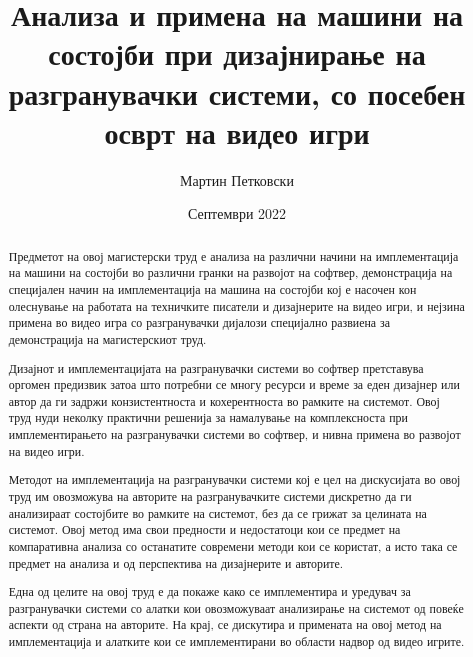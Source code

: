 \title{Анализа и примена на машини на состојби при дизајнирање на разгранувачки системи, со посебен осврт на видео игри}
\author{Мартин Петковски}
\date{Септември 2022}


\maketitle

\begin{abstract}
Предметот на овој магистерски труд е анализа на различни начини на имплементација на машини на состојби во различни гранки на развојот на софтвер, демонстрација на специјален начин на имплементација на машина на состојби кој е насочен кон олеснување на работата на техничките писатели и дизајнерите на видео игри, и нејзина примена во видео игра со разгранувачки дијалози специјално развиена за демонстрација на магистерскиот труд.

Дизајнот и имплементацијата на разгранувачки системи во софтвер претставува оргомен предизвик затоа што потребни се многу ресурси и време за еден дизајнер или автор да ги задржи конзистентноста и кохерентноста во рамките на системот. Овој труд нуди неколку практични решенија за намалување на комплексноста при имплементирањето на разгранувачки системи во софтвер, и нивна примена во развојот на видео игри.

Методот на имплементација на разгранувачки системи кој е цел на дискусијата во овој труд им овозможува на авторите на разгранувачките системи дискретно да ги анализираат состојбите во рамките на системот, без да се грижат за целината на системот. Овој метод има свои предности и недостатоци кои се предмет на компаративна анализа со останатите современи методи кои се користат, а исто така се предмет на анализа и од перспектива на дизајнерите и авторите.

Една од целите на овој труд е да покаже како се имплементира и уредувач за разгранувачки системи со алатки кои овозможуваат анализирање на системот од повеќе аспекти од страна на авторите. На крај, се дискутира и примената на овој метод на имплементација и алатките кои се имплементирани во области надвор од видео игрите.
\end{abstract}

